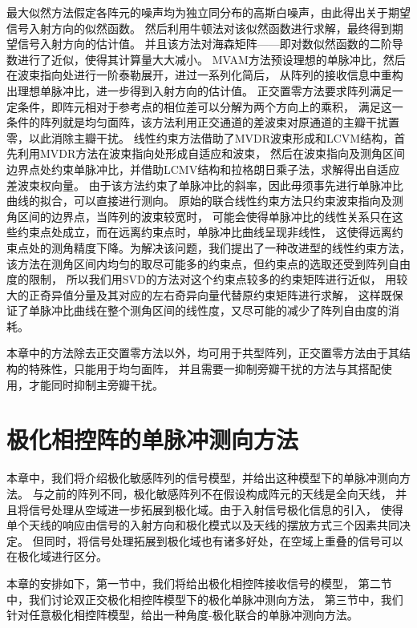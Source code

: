 \documentclass[master]{thesis-uestc}
\begin{document}
最大似然方法假定各阵元的噪声均为独立同分布的高斯白噪声，由此得出关于期望信号入射方向的似然函数。
然后利用牛顿法对该似然函数进行求解，最终得到期望信号入射方向的估计值。
并且该方法对海森矩阵——即对数似然函数的二阶导数进行了近似，使得其计算量大大减小。
MVAM方法预设理想的单脉冲比，然后在波束指向处进行一阶泰勒展开，进过一系列化简后，
从阵列的接收信息中重构出理想单脉冲比，进一步得到入射方向的估计值。
正交置零方法要求阵列满足一定条件，即阵元相对于参考点的相位差可以分解为两个方向上的乘积，
满足这一条件的阵列就是均匀面阵，该方法利用正交通道的差波束对原通道的主瓣干扰置零，以此消除主瓣干扰。
线性约束方法借助了MVDR波束形成和LCVM结构，首先利用MVDR方法在波束指向处形成自适应和波束，
然后在波束指向及测角区间边界点处约束单脉冲比，并借助LCMV结构和拉格朗日乘子法，求解得出自适应差波束权向量。
由于该方法约束了单脉冲比的斜率，因此毋须事先进行单脉冲比曲线的拟合，可以直接进行测向。
原始的联合线性约束方法只约束波束指向及测角区间的边界点，当阵列的波束较宽时，
可能会使得单脉冲比的线性关系只在这些约束点处成立，而在远离约束点时，单脉冲比曲线呈现非线性，
这使得远离约束点处的测角精度下降。为解决该问题，我们提出了一种改进型的线性约束方法，
该方法在测角区间内均匀的取尽可能多的约束点，但约束点的选取还受到阵列自由度的限制，
所以我们用SVD的方法对这个约束点较多的约束矩阵进行近似，
用较大的正奇异值分量及其对应的左右奇异向量代替原约束矩阵进行求解，
这样既保证了单脉冲比曲线在整个测角区间的线性度，又尽可能的减少了阵列自由度的消耗。

本章中的方法除去正交置零方法以外，均可用于共型阵列，正交置零方法由于其结构的特殊性，只能用于均匀面阵，
并且需要一抑制旁瓣干扰的方法与其搭配使用，才能同时抑制主旁瓣干扰。

\chapter{极化相控阵的单脉冲测向方法}
本章中，我们将介绍极化敏感阵列的信号模型，并给出这种模型下的单脉冲测向方法。
与之前的阵列不同，极化敏感阵列不在假设构成阵元的天线是全向天线，
并且将信号处理从空域进一步拓展到极化域。由于入射信号极化信息的引入，
使得单个天线的响应由信号的入射方向和极化模式以及天线的摆放方式三个因素共同决定。
但同时，将信号处理拓展到极化域也有诸多好处，在空域上重叠的信号可以在极化域进行区分。

本章的安排如下，第一节中，我们将给出极化相控阵接收信号的模型，
第二节中，我们讨论双正交极化相控阵模型下的极化单脉冲测向方法，
第三节中，我们针对任意极化相控阵模型，给出一种角度-极化联合的单脉冲测向方法。
\end{document}
